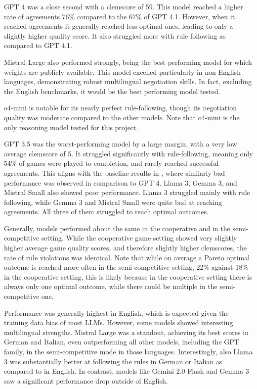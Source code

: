 GPT 4 was a close second with a clemscore of 59. This model reached a higher rate of agreements 76\% compared to the 67\% of GPT 4.1. However, when it reached agreements it generally reached less optimal ones, leading to only a slightly higher quality score. It also struggled more with rule following as compared to GPT 4.1.

Mistral Large also performed strongly, being the best performing model for which weights are publicly available. This model excelled particularly in non-English languages, demonstrating robust multilingual negotiation skills. In fact, excluding the English benchmarks, it would be the best performing model tested.

o4-mini is notable for its nearly perfect rule-following, though its negotiation quality was moderate compared to the other models. Note that o4-mini is the only reasoning model tested for this project.

GPT 3.5 was the worst-performing model by a large margin, with a very low average clemscore of 5. It struggled significantly with rule-following, meaning only 54\% of games were played to completion, and rarely reached successful agreements. This aligns with the baseline results in \cite{liao2024efficacy}, where similarly bad performance was observed in comparison to GPT 4. Llama 3, Gemma 3, and Mistral Small also showed poor performance. Llama 3 struggled mainly with rule following, while Gemma 3 and Mistral Small were quite bad at reaching agreements. All three of them struggled to reach optimal outcomes.

Generally, models performed about the same in the cooperative and in the semi-competitive setting. While the cooperative game setting showed very slightly higher average game quality scores, and therefore slightly higher clemscores, the rate of rule violations was identical. Note that while on average a Pareto optimal outcome is reached more often in the semi-competitive setting, 22\% against 18\% in the cooperative setting, this is likely because in the cooperative setting there is always only one optimal outcome, while there could be multiple in the semi-competitive one.

Performance was generally highest in English, which is expected given the training data bias of most LLMs. However, some models showed interesting multilingual strengths. Mistral Large was a standout, achieving its best scores in German and Italian, even outperforming all other models, including the GPT family, in the semi-competitive mode in those languages. Interestingly, also Llama 3 was substantially better at following the rules in German or Italian as compared to in English. In contrast, models like Gemini 2.0 Flash and Gemma 3 saw a significant performance drop outside of English.


